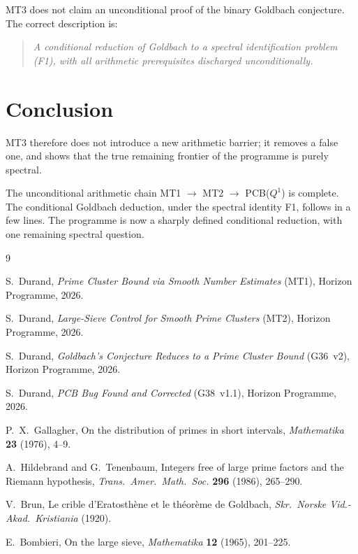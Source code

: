 \documentclass[11pt,a4paper]{article}
\begin{document}
MT3 does not claim an unconditional proof of the binary Goldbach conjecture. The correct description is:

\begin{quote}
\emph{A conditional reduction of Goldbach to a spectral identification problem (F1), with all arithmetic prerequisites discharged unconditionally.}
\end{quote}

\section{Conclusion}

MT3 therefore does not introduce a new arithmetic barrier; it removes a false one, and shows that the true remaining frontier of the programme is purely spectral.

The unconditional arithmetic chain MT1 $\to$ MT2 $\to$ PCB($Q^1$) is complete. The conditional Goldbach deduction, under the spectral identity F1, follows in a few lines. The programme is now a sharply defined conditional reduction, with one remaining spectral question.

\begin{thebibliography}{9}

 S.~Durand, \emph{Prime Cluster Bound via Smooth Number Estimates} (MT1), Horizon Programme, 2026.

 S.~Durand, \emph{Large-Sieve Control for Smooth Prime Clusters} (MT2), Horizon Programme, 2026.

 S.~Durand, \emph{Goldbach's Conjecture Reduces to a Prime Cluster Bound} (G36~v2), Horizon Programme, 2026.

 S.~Durand, \emph{PCB Bug Found and Corrected} (G38~v1.1), Horizon Programme, 2026.

 P.~X.~Gallagher, On the distribution of primes in short intervals, \emph{Mathematika} \textbf{23} (1976), 4--9.

 A.~Hildebrand and G.~Tenenbaum, Integers free of large prime factors and the Riemann hypothesis, \emph{Trans.\ Amer.\ Math.\ Soc.} \textbf{296} (1986), 265--290.

 V.~Brun, Le crible d'Eratosth\`{e}ne et le th\'{e}or\`{e}me de Goldbach, \emph{Skr.\ Norske Vid.-Akad.\ Kristiania} (1920).

 E.~Bombieri, On the large sieve, \emph{Mathematika} \textbf{12} (1965), 201--225.

\end{thebibliography}
\end{document}

